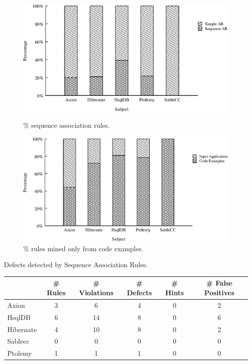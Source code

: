 \begin{figure}[t]
\centering
\includegraphics[scale=0.50,clip]{charts/trigger-path.eps}\vspace*{-1ex}
\caption{\label{chart:trigger-path} \% sequence association rules.}
\includegraphics[scale=0.50,clip]{charts/data-scope.eps}\vspace*{-1ex}
\caption{\label{chart:data-scope} \% rules mined only from code examples.}
\vspace*{-3ex}
\end{figure}
\setlength{\tabcolsep}{1pt}
\begin{table}[t]
\begin{SmallOut}
\begin{CodeOut}
\begin{center}
\centering \caption {\label{tab:condassorules} Defects detected by Sequence Association Rules.}
\begin {tabular} {|l|c|c|c|c|c|}
\hline
&\# Rules&\# Violations&\# Defects&\# Hints&\# False Positives \\
\hline
\hline Axion & 3 & 6 & 4 & 0 & 2\\
\hline HsqlDB & 6	& 14	&8	&0	&6\\
\hline Hibernate & 4 &10	&8	&0	&2\\
\hline Sablecc & 0 &0	&0	&0	&0\\
\hline Ptolemy & 1 &1	&1	&0	&0\\
\hline
\end{tabular}
\end{center}
\end{CodeOut}
\end{SmallOut}\vspace*{-6ex}
\end{table}
